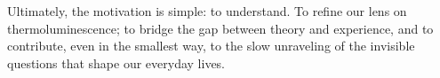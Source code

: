 \vspace{10pt}

Ultimately, the motivation is simple: to understand. To refine our lens on thermoluminescence; to bridge the gap between theory and experience, and to contribute, even in the smallest way, to the slow unraveling of the invisible questions that shape our everyday lives.


\begin{comment}
    This curve is more than just a trace---it is a fingerprint of the radiation dose absorbed by the material, and so it provides clues to pinpoint how much radiation the material has actually been exposed to. Each peak in the curve corresponds to a distinct defect in the crystal's structure, and their properties of intensity and position in the temperature axis can be used to determine the radiation dose. By unraveling the meaning behind these peaks, we uncover the foundation for building a realiable dose-response relationship. By doing so, we gain not just a method, but a powerful lens through which we can peek at the invisible trace of radiation becomes measurable. This quiet transformation ---from light to knowledge--- is the very essence of dosimetry.
\end{comment}
